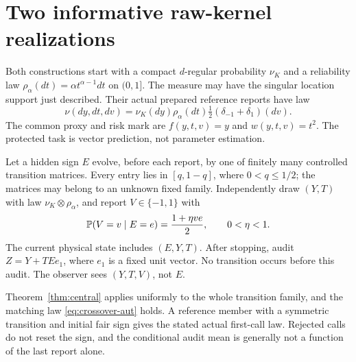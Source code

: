 \section{Two informative raw-kernel realizations}\label{sec:realizations}
Both constructions start with a compact $d$-regular probability $\nu_K$ and a reliability law $\rho_\alpha(dt)=\alpha t^{\alpha-1}dt$ on $(0,1]$. The measure may have the singular location support just described. Their actual prepared reference reports have law
\[
 \nu(dy,dt,dv)=\nu_K(dy)\rho_\alpha(dt)\tfrac12(\delta_{-1}+\delta_1)(dv).
\]
The common proxy and risk mark are $f(y,t,v)=y$ and $w(y,t,v)=t^2$. The protected task is vector prediction, not parameter estimation.

\begin{theorem}\label{thm:classical}
Let a hidden sign $E$ evolve, before each report, by one of finitely many controlled transition matrices. Every entry lies in $[q,1-q]$, where $0<q\le1/2$; the matrices may belong to an unknown fixed family. Independently draw $(Y,T)$ with law $\nu_K\otimes\rho_\alpha$, and report $V\in\{-1,1\}$ with
\[
 \mathbb P(V=v\mid E=e)=\frac{1+\eta ve}{2},\qquad0<\eta<1.
\]
The current physical state includes $(E,Y,T)$. After stopping, audit
$Z=Y+TEe_1$, where $e_1$ is a fixed unit vector. No transition occurs before this audit. The observer sees $(Y,T,V)$, not $E$.

Theorem~\ref{thm:central} applies uniformly to the whole transition family, and the matching law \eqref{eq:crossover-aut} holds. A reference member with a symmetric transition and initial fair sign gives the stated actual first-call law. Rejected calls do not reset the sign, and the conditional audit mean is generally not a function of the last report alone.
\end{theorem}
